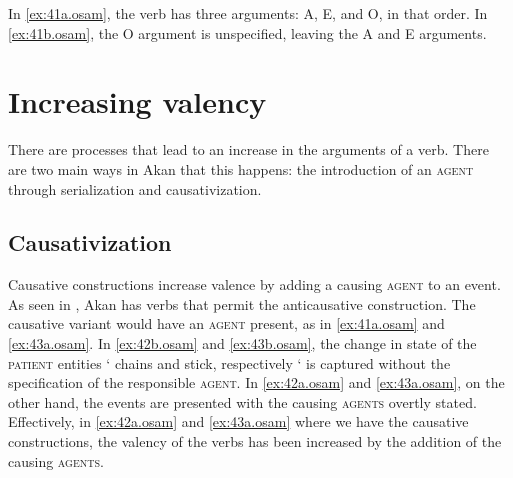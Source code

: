 \documentclass[output=paper]{langsci/langscibook}
\begin{document}
In \ref{ex:41a.osam}, the verb has three arguments: A, E, and O, in that order. In \ref{ex:41b.osam}, the O argument is unspecified, leaving the A and E arguments.

\section{Increasing valency}\label{§5:increasing.osam}

There are processes that lead to an increase in the arguments of a verb. There are two main ways in Akan that this happens: the introduction of an \textsc{agent} through serialization and causativization.

\subsection{Causativization}\label{§5.1:causativization.osam}

Causative constructions increase valence by adding a causing \textsc{agent} to an event. As seen in , Akan has verbs that permit the anticausative construction. The causative variant would have an \textsc{agent} present, as in \ref{ex:41a.osam} and \ref{ex:43a.osam}. In \ref{ex:42b.osam} and \ref{ex:43b.osam}, the change in state of the \textsc{patient} entities ` chains and stick, respectively ` is captured without the specification of the responsible \textsc{agent}. In \ref{ex:42a.osam} and \ref{ex:43a.osam}, on the other hand, the events are presented with the causing \textsc{agents} overtly stated. Effectively, in \ref{ex:42a.osam} and \ref{ex:43a.osam} where we have the causative constructions, the valency of the verbs has been increased by the addition of the causing \textsc{agents}.

\ea
\label{ex:42.osam}
	\z

	\z
\z
\end{document}
